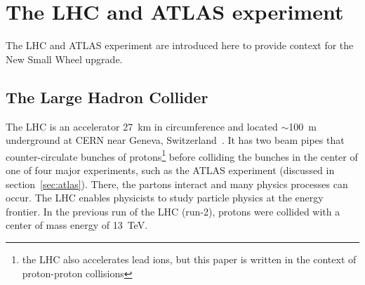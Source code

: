 
\chapter{The LHC and ATLAS experiment}
\label{chap:lhc_atlas}

The LHC and ATLAS experiment are introduced here to provide context for the New Small Wheel upgrade. 

\section{The Large Hadron Collider}

The LHC is an accelerator \SI{27}{\kilo\meter} in circumference and located $\sim$\SI{100}{\meter} underground at CERN near Geneva, Switzerland~\cite{evans_lhc_2008}. It has two beam pipes that counter-circulate bunches of protons\footnote{the LHC also accelerates lead ions, but this paper is written in the context of proton-proton collisions} before colliding the bunches in the center of one of four major experiments, such as the ATLAS experiment (discussed in section~\ref{sec:atlas}). There, the partons interact and many physics processes can occur. The LHC enables physicists to study particle physics at the energy frontier. In the previous run of the LHC (run-2), protons were collided with a center of mass energy of \SI{13}{\tera\electronvolt}. 


